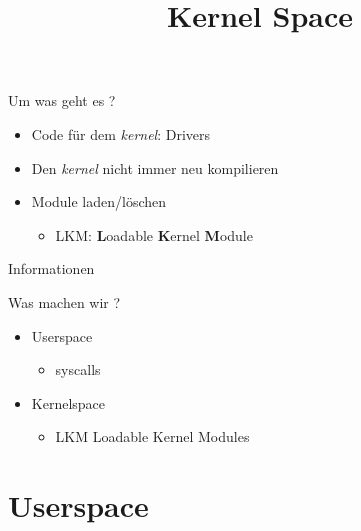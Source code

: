 \documentclass{beamer}
\begin{document}
\title[Kernel Module]{Kernel Space}

\frame{\titlepage}

\begin{frame}{Um was geht es ?}
 \begin{itemize}
  \item Code für dem {\em kernel}: Drivers
  \item Den {\em kernel} nicht immer neu kompilieren 
  \item Module laden/löschen
  \begin{itemize}
   \item LKM: {\bf L}oadable {\bf K}ernel {\bf M}odule
  \end{itemize}
 \end{itemize}
\end{frame}

\begin{frame}{Informationen}
\end{frame}

\begin{frame}{Was machen wir ?}
 \begin{itemize}
  \item Userspace
  \begin{itemize}
   \item syscalls
  \end{itemize}
  \item Kernelspace
  \begin{itemize}
   \item LKM Loadable Kernel Modules
  \end{itemize} 
 \end{itemize} 
\end{frame}

\section{Userspace}

\end{document}
